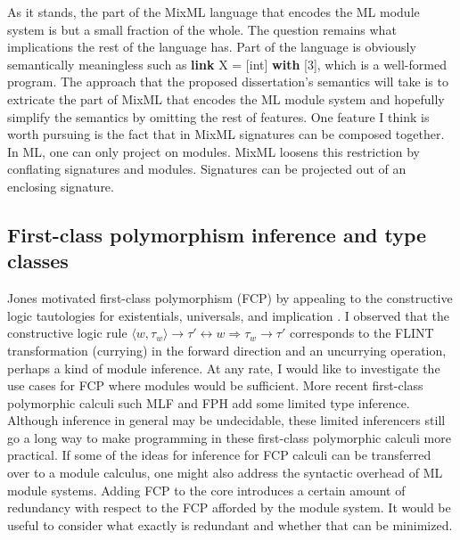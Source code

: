 \documentclass[12pt]{article}
\begin{document}
	As it stands, the part of the MixML language that encodes the ML module system is but a small fraction of the whole. The question remains what implications the rest of the language has. Part of the language is obviously semantically meaningless such as {\bf link} X = [int] {\bf with} [3], which is a well-formed program. The approach that the proposed dissertation's semantics will take is to extricate the part of MixML that encodes the ML module system and hopefully simplify the semantics by omitting the rest of features. One feature I think is worth pursuing is the fact that in MixML signatures can be composed together. In ML, one can only project on modules. MixML \cite{mixml} loosens this restriction by conflating signatures and modules. Signatures can be projected out of an enclosing signature. 


\subsection{First-class polymorphism inference and type classes}
	Jones \cite{jonesfcp} motivated first-class polymorphism (FCP) by appealing to the constructive logic tautologies for existentials, universals, and implication \cite{jonesfcp}. I observed that the constructive logic rule $\langle w, \tau_w\rangle \rightarrow \tau' \leftrightarrow w \Rightarrow \tau_w \rightarrow \tau'$ corresponds to the FLINT transformation (currying) in the forward direction and an uncurrying operation, perhaps a kind of module inference. At any rate, I would like to investigate the use cases for FCP where modules would be sufficient. More recent first-class polymorphic calculi such MLF\cite{Lebotlan-Remy/mlf-icfp} and FPH \cite{fph} add some limited type inference. Although inference in general may be undecidable, these limited inferencers still go a long way to make programming in these first-class polymorphic calculi more practical. If some of the ideas for inference for FCP calculi can be transferred over to a module calculus, one might also address the syntactic overhead of ML module systems. Adding FCP to the core introduces a certain amount of redundancy with respect to the FCP afforded by the module system. It would be useful to consider what exactly is redundant and whether that can be minimized. 
		
\end{document}

